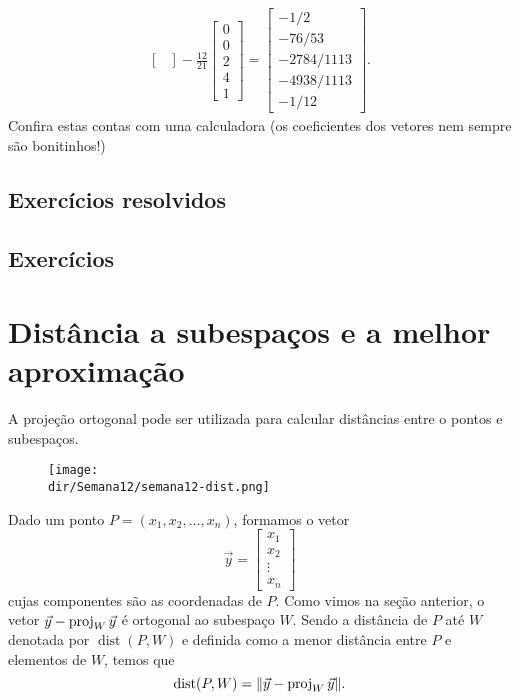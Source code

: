 \documentclass[../livro.tex]{subfiles}  %
\providecommand{\dir}{..}
\begin{document}
\begin{example}
\begin{equation}
\begin{split}
\begin{bmatrix}
\end{bmatrix} - \frac{12}{21} \begin{bmatrix}
 0\\0\\2\\4\\ 1
\end{bmatrix} =
\begin{bmatrix}
 -1/2 \\ -76/53 \\ -2784/1113 \\ -4938/1113 \\ -1/12
\end{bmatrix}.
\end{split}
\end{equation}Confira estas contas com uma calculadora (os coeficientes dos vetores nem sempre são bonitinhos!)
\end{example}


\subsection*{Exercícios resolvidos}

\construirExeresol

\subsection*{Exercícios}

\construirExer

\section{Distância a subespaços e a melhor aproximação}


A projeção ortogonal pode ser utilizada para calcular distâncias entre o pontos e subespaços.

\begin{figure}[h!]
\begin{center}
\texttt{[image: \\dir/Semana12/semana12-dist.png]}
\end{center}
\end{figure}

\noindent Dado um ponto $P = (x_1, x_2, \dots, x_n)$, formamos o vetor
\begin{equation}
\vec{y} =
\begin{bmatrix}
x_1 \\ x_2 \\ \vdots \\ x_n
\end{bmatrix}
\end{equation} cujas componentes são as coordenadas de $P$. Como vimos na seção anterior, o vetor $\vec{y} - \operatorname{proj}_{W} \vec{y}$ é ortogonal ao subespaço $W$. Sendo a distância de $P$ até $W$ denotada por $\operatorname{dist} (P,W)$ e definida como a menor distância entre $P$ e elementos de $W$, temos que
\begin{equation}
\operatorname{dist} (P,W) = \|\vec{y} - \operatorname{proj}_{W} \vec{y}\|.
\end{equation}
\end{document}
